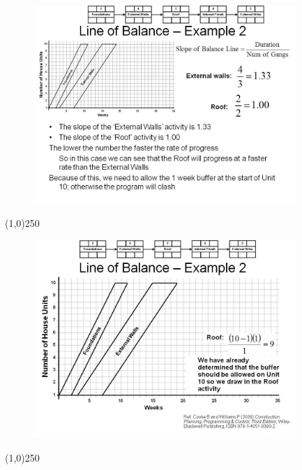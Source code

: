\begin{frame}
\begin{figure}
	\centering
		\includegraphics[width = 10.0cm]{oldnotes/Slide261.jpg}
\end{figure}
\end{frame}
\begin{center}\line(1,0){250}\end{center}






\begin{frame}
\begin{figure}
	\centering
		\includegraphics[width = 10.0cm]{oldnotes/Slide262.jpg}
\end{figure}
\end{frame}
\begin{center}\line(1,0){250}\end{center}






